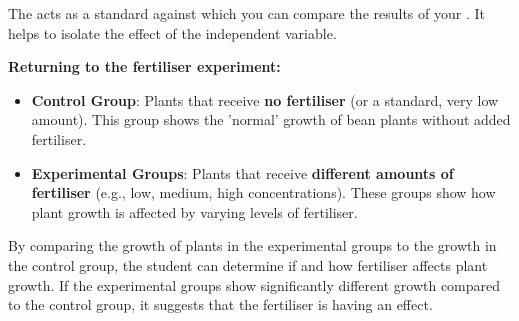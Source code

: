 The  acts as a standard against which you can compare the results of your .  It helps to isolate the effect of the independent variable.

\begin{example}
\textbf{Returning to the fertiliser experiment:}

\begin{itemize}
    \item \textbf{Control Group}: Plants that receive \textbf{no fertiliser} (or a standard, very low amount). This group shows the 'normal' growth of bean plants without added fertiliser.
    \item \textbf{Experimental Groups}: Plants that receive \textbf{different amounts of fertiliser} (e.g., low, medium, high concentrations). These groups show how plant growth is affected by varying levels of fertiliser.
\end{itemize}
By comparing the growth of plants in the experimental groups to the growth in the control group, the student can determine if and how fertiliser affects plant growth. If the experimental groups show significantly different growth compared to the control group, it suggests that the fertiliser is having an effect.

\end{example}

